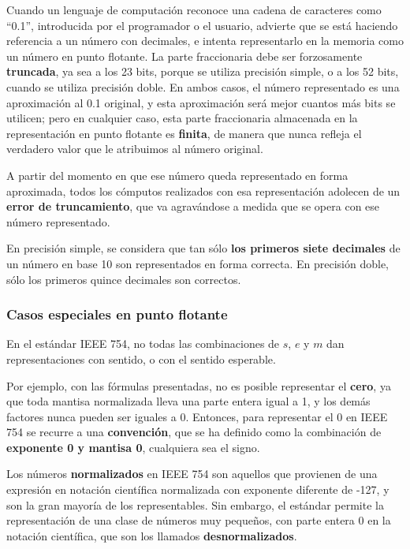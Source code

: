 \documentclass[spanish,A4,]{article}
\begin{document}
Cuando un lenguaje de computación reconoce una cadena de caracteres como
``0.1'', introducida por el programador o el usuario, advierte que se
está haciendo referencia a un número con decimales, e intenta
representarlo en la memoria como un número en punto flotante. La parte
fraccionaria debe ser forzosamente \textbf{truncada}, ya sea a los 23
bits, porque se utiliza precisión simple, o a los 52 bits, cuando se
utiliza precisión doble. En ambos casos, el número representado es una
aproximación al 0.1 original, y esta aproximación será mejor cuantos más
bits se utilicen; pero en cualquier caso, esta parte fraccionaria
almacenada en la representación en punto flotante es \textbf{finita}, de
manera que nunca refleja el verdadero valor que le atribuimos al número
original.

A partir del momento en que ese número queda representado en forma
aproximada, todos los cómputos realizados con esa representación
adolecen de un \textbf{error de truncamiento}, que va agravándose a
medida que se opera con ese número representado.

En precisión simple, se considera que tan sólo \textbf{los primeros
siete decimales} de un número en base 10 son representados en forma
correcta. En precisión doble, sólo los primeros quince decimales son
correctos.

\subsubsection{Casos especiales en punto
flotante}\label{casos-especiales-en-punto-flotante}

En el estándar IEEE 754, no todas las combinaciones de $s$, $e$ y $m$
dan representaciones con sentido, o con el sentido esperable.

Por ejemplo, con las fórmulas presentadas, no es posible representar el
\textbf{cero}, ya que toda mantisa normalizada lleva una parte entera
igual a 1, y los demás factores nunca pueden ser iguales a 0. Entonces,
para representar el 0 en IEEE 754 se recurre a una \textbf{convención},
que se ha definido como la combinación de \textbf{exponente 0 y mantisa
0}, cualquiera sea el signo.

Los números \textbf{normalizados} en IEEE 754 son aquellos que provienen
de una expresión en notación científica normalizada con exponente
diferente de -127, y son la gran mayoría de los representables. Sin
embargo, el estándar permite la representación de una clase de números
muy pequeños, con parte entera 0 en la notación científica, que son los
llamados \textbf{desnormalizados}.
\end{document}
